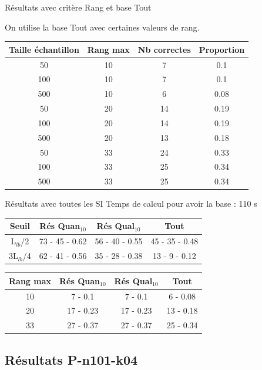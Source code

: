 \documentclass{beamer}
\begin{document}
\begin{frame}{Résultats avec critère Rang et base Tout}

On utilise la base Tout avec certaines valeurs de rang.
\begin{tabular}{|c|c|c|c|}
   \hline
   Taille échantillon & Rang max & Nb correctes & Proportion\\
   \hline
   50 & 10  & 7 & 0.1  \\
   \hline
   100 & 10  & 7 & 0.1  \\
   \hline
   500 & 10  & 6 & 0.08  \\
   \hline
   \hline
   50 & 20  & 14 & 0.19  \\
   \hline
   100 & 20 & 14 & 0.19  \\
   \hline
   500 & 20 & 13 & 0.18  \\
   \hline
   \hline
   50 & 33 & 24 & 0.33  \\
   \hline
   100 & 33 & 25 & 0.34  \\
   \hline
   500 & 33 & 25 & 0.34  \\
   \hline
\end{tabular}
\end{frame}


\begin{frame}{Résultats avec toutes les SI}
Temps de calcul pour avoir la base : 110 s

\centering
\begin{tabular}{|c|c|c|c|}
   \hline
   Seuil & Rés Quan$_{10}$ & Rés Qual$_{10}$ & Tout \\
   \hline
   L$_{lb}$/2 & 73 - 45 - 0.62 & 56 - 40 - 0.55 & 45 - 35 - 0.48 \\
   \hline
   3L$_{lb}$/4 & 62 - 41 - 0.56 & 35 - 28 - 0.38  & 13 - 9 - 0.12 \\
   \hline
\end{tabular}

\begin{tabular}{|c|c|c|c|}
   \hline
   Rang max & Rés Quan$_{10}$ & Rés Qual$_{10}$ & Tout \\
   \hline
   10 & 7 - 0.1 & 7 - 0.1 & 6 - 0.08 \\
   \hline
   20 & 17 - 0.23 & 17 - 0.23 & 13 - 0.18 \\
   \hline
   33 & 27 - 0.37 & 27 - 0.37 & 25 - 0.34 \\
   \hline
\end{tabular}

\end{frame}


\subsection{Résultats P-n101-k04}
\end{document}
